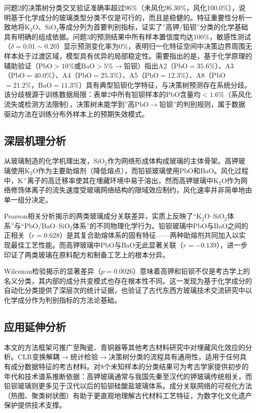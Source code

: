 \documentclass[12pt,a4paper]{ctexart}
\begin{document}
问题2的决策树分类交叉验证准确率超过96\%（未风化96.30\%，风化100.0\%），说明基于化学成分的玻璃类型分类不仅是可行的，而且是稳健的。特征重要性分析一致地将K$_2$O、SiO$_2$等成分列为首要判别指标，证实了”高钾/铅钡”分类的化学基础具有明确的组成依据。问题3的预测结果中所有样本置信度均达100\%，敏感性测试（$\delta=0.01\sim0.20$）显示预测变化率为0\%，表明归一化特征空间中决策边界周围无样本处于过渡区域，模型具有优异的局部稳定性。需要指出的是，基于化学原理的辅助验证（PbO$>10\%$或BaO$>5\%\rightarrow$铅钡）指出A2（PbO$=35.6\%$）、A3（PbO$=40.0\%$）、A4（PbO$=25.3\%$）、A5（PbO$=12.3\%$）、A8（PbO$=21.2\%$，BaO$=11.3\%$）具有典型铅钡化学特征，与决策树预测存在系统分歧。该分歧根源于训练数据局限：表单2中所有铅钡样本的PbO含量均$<1.6\%$（系风化流失或检测方法限制），决策树未能学到”高PbO$\rightarrow$铅钡”的判别规则，属于数据驱动方法在训练分布外样本上的预期失效模式。

\subsection{深层机理分析}

从玻璃制造的化学机理出发，SiO$_2$作为网络形成体构成玻璃的主体骨架。高钾玻璃使用K$_2$O作为主要助熔剂（降低熔点），而铅钡玻璃使用PbO和BaO。风化过程中，K$^+$离子的高迁移率使其在埋藏环境中易于溶出，然而高钾玻璃中K$_2$O作为网络修饰体离子的流失速度受玻璃网络结构的限域效应制约\cite{3}，风化速率并非简单地由单一组分决定。

Pearson相关分析揭示的两类玻璃成分关联差异，实质上反映了“K$_2$O--SiO$_2$体系”与“PbO/BaO--SiO$_2$体系”的不同物理化学行为。铅钡玻璃中PbO与BaO之间的正相关（$r=0.628$）是其复合助熔体系的固有特征——两种助熔剂共同加入以实现最佳工艺性能。而高钾玻璃中PbO与BaO无此显著关联（$r=-0.139$），进一步印证了两类玻璃在原料配方和制备工艺上的根本分异\cite{1}。

Wilcoxon检验揭示的显著差异（$p=0.0026$）意味着高钾和铅钡不仅是考古学上的名义分类，其内部的成分共变模式也存在根本性不同。这一发现为基于化学成分的自动化分类提供了深层次的统计证据，也验证了古代东西方玻璃技术交流研究中以化学成分作为判别指标的方法论基础\cite{9}。

\subsection{应用延伸分析}

本文的方法框架可推广至陶瓷、青铜器等其他考古材料研究中对埋藏风化效应的分析。CLR变换解耦$\rightarrow$统计检验$\rightarrow$决策树分类的流程具有通用性，适用于任何具有成分数据特征的考古材料。对8个未知样本的分类结果可为考古学家提供初步的年代和技术谱系推断依据：高钾玻璃通常与我国先秦至汉代的钾玻璃传统相关，而铅钡玻璃则更多见于汉代以后的铅钡硅酸盐玻璃体系。成分关联网络的可视化方法（热图、聚类树状图）有助于更直观地理解古代材料工艺特征，为数字化文化遗产保护提供技术支撑。
\end{document}
